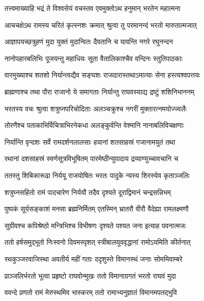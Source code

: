 \twolineshloka
{तत्त्वमाख्याहि भद्रं ते विश्वसेयं वचस्तव}
{एवमुक्तोऽथ हनुमान् भरतेन महात्मना} %

\twolineshloka
{आचचक्षेऽथ रामस्य चरितं कृत्स्नशः क्रमात्}
{श्रुत्वा तु परमानन्दं भरतो मारुतात्मजात्} %

\twolineshloka
{आज्ञापयच्छत्रुहणं मुदा युक्तं मुदान्वितः}
{दैवतानि च यावन्ति नगरे रघुनन्दन} %

\twolineshloka
{नानोपहारबलिभिः पूजयन्तु महाधियः}
{सूता वैतालिकाश्चैव वन्दिनः स्तुतिपाठकाः} %

\twolineshloka
{वारमुख्याश्च शतशो निर्यान्त्वद्यैव सङ्घशः}
{राजदारास्तथाऽमात्याः सेना हस्त्यश्वपत्तयः} %

\twolineshloka
{ब्राह्मणाश्च तथा पौरा राजानो ये समागताः}
{निर्यान्तु राघवस्याद्य द्रष्टुं शशिनिभाननम्} %

\twolineshloka
{भरतस्य वचः श्रुत्वा शत्रुघ्नपरिचोदिताः}
{अलञ्चक्रुश्च नगरीं मुक्तारत्नमयोज्ज्वलैः} %

\twolineshloka
{तोरणैश्च पताकाभिर्विचित्राभिरनेकधा}
{अलङ्कुर्वन्ति वेश्मानि नानाबलिविचक्षणाः} %

\twolineshloka
{निर्यान्ति वृन्दशः सर्वे रामदर्शनलालसाः}
{हयानां शतसाहस्रं गजानामयुतं तथा} %

\twolineshloka
{रथानां दशसाहस्रं स्वर्णसूत्रविभूषितम्}
{पारमेष्ठीन्युपादाय द्रव्याण्युच्चावचानि च} %

\twolineshloka
{ततस्तु शिबिकारूढा निर्ययू राजयोषितः}
{भरतः पादुके न्यस्य शिरस्येव कृताञ्जलिः} %

\twolineshloka
{शत्रुघ्नसहितो रामं पादचारेण निर्ययौ}
{तदैव दृश्यते दूराद्विमानं चन्द्रसन्निभम्} %

\twolineshloka
{पुष्पकं सूर्यसङ्काशं मनसा ब्रह्मनिर्मितम्}
{एतस्मिन् भ्रातरौ वीरौ वैदेह्या रामलक्ष्मणौ} %

\twolineshloka
{सुग्रीवश्च कपिश्रेष्ठो मन्त्रिभिश्च विभीषणः}
{दृश्यते पश्यत जना इत्याह पवनात्मजः} %

\twolineshloka
{ततो हर्षसमुद्भूतो निःस्वनो दिवमस्पृशत्}
{स्त्रीबालयुववृद्धानां रामोऽयमिति कीर्तनात्} %

\twolineshloka
{रथकुञ्जरवाजिस्था अवतीर्य महीं गताः}
{ददृशुस्ते विमानस्थं जनाः सोममिवाम्बरे} %

\twolineshloka
{प्राञ्जलिर्भरतो भूत्वा प्रहृष्टो राघवोन्मुखः}
{ततो विमानाग्रगतं भरतो राघवं मुदा} %

\twolineshloka
{ववन्दे प्रणतो रामं मेरुस्थमिव भास्करम्}
{ततो रामाभ्यनुज्ञातं विमानमपतद्भुवि} %

